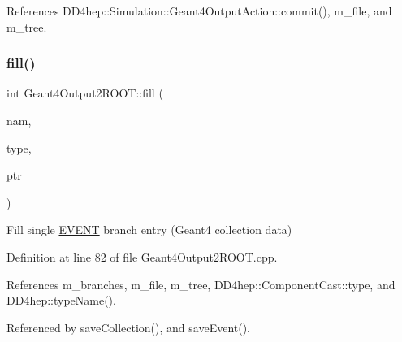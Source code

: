 References D\+D4hep\+::\+Simulation\+::\+Geant4\+Output\+Action\+::commit(), m\+\_\+file, and m\+\_\+tree.

\hypertarget{class_d_d4hep_1_1_simulation_1_1_geant4_output2_r_o_o_t_acaa86fe60f13b62e6331e34182cdd75f}{}\label{class_d_d4hep_1_1_simulation_1_1_geant4_output2_r_o_o_t_acaa86fe60f13b62e6331e34182cdd75f} 
\subsubsection{\texorpdfstring{fill()}{fill()}}
{\footnotesize\ttfamily int Geant4\+Output2\+R\+O\+O\+T\+::fill (\begin{DoxyParamCaption}\item[{const std\+::string \&}]{nam,  }\item[{const \hyperlink{class_d_d4hep_1_1_component_cast}{Component\+Cast} \&}]{type,  }\item[{void $\ast$}]{ptr }\end{DoxyParamCaption})}



Fill single \hyperlink{namespace_e_v_e_n_t}{E\+V\+E\+NT} branch entry (Geant4 collection data) 



Definition at line 82 of file Geant4\+Output2\+R\+O\+O\+T.\+cpp.



References m\+\_\+branches, m\+\_\+file, m\+\_\+tree, D\+D4hep\+::\+Component\+Cast\+::type, and D\+D4hep\+::type\+Name().



Referenced by save\+Collection(), and save\+Event().

\hypertarget{class_d_d4hep_1_1_simulation_1_1_geant4_output2_r_o_o_t_a1f61031bde79ed84a62145cb32ac4428}{}\label{class_d_d4hep_1_1_simulation_1_1_geant4_output2_r_o_o_t_a1f61031bde79ed84a62145cb32ac4428} 
